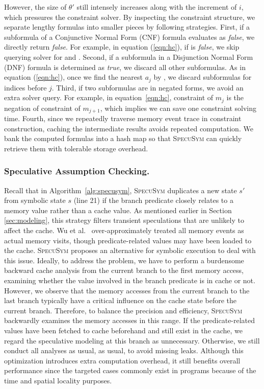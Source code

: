 \documentclass[sigconf,screen]{acmart}
\newcommand*\circled[1]{\tikz[baseline=(char.base)]{
				\node[shape=circle,draw,inner sep=1pt] (char) {\scriptsize{#1}};}}
\newcommand{\SpecuSym}{\textsc{SpecuSym} }
\begin{document}
However, the size of $\theta'$ still intensely increases along with the 
increment of $i$, which pressures the constraint solver. By inspecting 
the constraint structure, we separate lengthy formulas into smaller 
pieces by following strategies. First, if a subformula of a Conjunctive 
Normal Form (CNF) formula evaluates as \textit{false}, we directly return 
\textit{false}. For example, in equation (\ref{eqn:hc}), if \circled{4} 
is \textit{false}, we skip querying solver for \circled{5} and \circled{6}. 
Second, if a subformula in a Disjunction Normal Form (DNF) formula is 
determined as \textit{true}, we discard all other subformulas. As in 
equation (\ref{eqn:hc}), once we find the nearest $\mathit{a_j}$ by 
\circled{5}, we discard subformulas for indices before $j$. Third, if 
two subformulas are in negated forms, we avoid an extra solver query. For 
example, in equation~\ref{eqn:hc}, constraint \circled{5} of $\mathit{m_j}$ 
is the negation of constraint \circled{4} of $\mathit{m}_{\mathit{j}+1}$, 
which implies we can save one constraint solving time. Fourth, since we 
repeatedly traverse memory event trace in constraint construction, caching 
the intermediate results avoids repeated computation. We bank the computed 
formulas into a hash map so that \SpecuSym can quickly retrieve them with 
tolerable storage overhead. 



\subsubsection{Speculative Assumption Checking.}
Recall that in Algorithm~\ref{alg:specusym}, \SpecuSym duplicates a new state 
$s'$ from symbolic state $s$ (line 21) if the branch predicate closely relates 
to a memory value rather than a cache value. As mentioned earlier in Section
\ref{sec:modeling}, this strategy filters transient speculations that are unlikely 
to affect the cache. Wu et al.~\cite{WuW19} over-approximately treated all memory 
events as actual memory visits, though predicate-related values may have been 
loaded to the cache. \SpecuSym proposes an alternative for symbolic execution to 
deal with this issue. Ideally, to address the problem, we have to perform a 
burdensome backward cache analysis from the current branch to the first memory 
access, examining whether the value involved in the branch predicate is in cache 
or not. However, we observe that the memory accesses from the current branch 
to the last branch typically have a critical influence on the cache state before 
the current branch. Therefore, to balance the precision and efficiency, \SpecuSym 
backwardly examines the memory accesses in this range. If the predicate-related 
values have been fetched to cache beforehand and still exist in the cache, we 
regard the speculative modeling at this branch as unnecessary. Otherwise, we still 
conduct all analyses as usual, as usual, to avoid missing leaks. Although this 
optimization introduces extra computation overhead, it still benefits overall 
performance since the targeted cases commonly exist in programs because of the time 
and spatial locality purposes.
\end{document}
